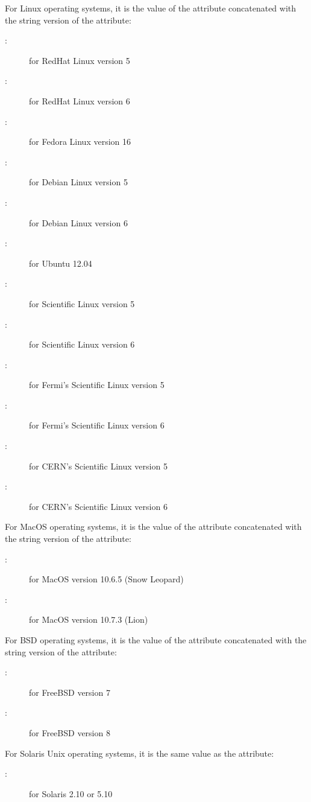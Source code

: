 \begin{description}
For Linux operating systems, it is the value of the  attribute 
concatenated with the string version of the  attribute:
	\begin{description}
	\item[:] for RedHat Linux version 5
	\item[:] for RedHat Linux version 6
	\item[:] for Fedora Linux version 16
	\item[:] for Debian Linux version 5
	\item[:] for Debian Linux version 6
	\item[:] for Ubuntu 12.04
	\item[:] for Scientific Linux version 5
	\item[:] for Scientific Linux version 6
	\item[:] for Fermi's Scientific Linux version 5
	\item[:] for Fermi's Scientific Linux version 6
	\item[:] for CERN's Scientific Linux version 5
	\item[:] for CERN's Scientific Linux version 6
	\end{description}
For MacOS operating systems, it is the value of the  
attribute concatenated with the string version of the  attribute: 
	\begin{description}
	\item[:] for MacOS version 10.6.5 (Snow Leopard)
	\item[:] for MacOS version 10.7.3 (Lion)
	\end{description}
For BSD operating systems, it is the value of the  attribute 
concatenated with the string version of the  attribute:
	\begin{description}
	\item[:] for FreeBSD version 7
	\item[:] for FreeBSD version 8
	\end{description}
For Solaris Unix operating systems, 
it is the same value as the  attribute: 
	\begin{description}
	\item[:] for Solaris 2.10 or 5.10

\end{description}
\end{description}
